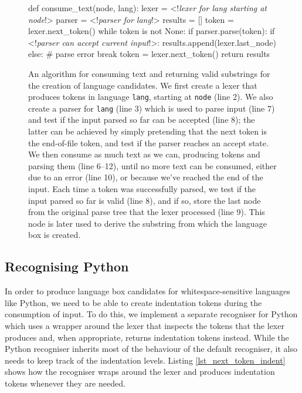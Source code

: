 \documentclass[sigplan,screen]{acmart}\settopmatter{printfolios=true,printccs=false,printacmref=false}
\begin{document}
\begin{figure}
\begin{lstdefault}[]
def consume_text(node, lang):
  lexer = <!\textit{lexer for lang starting at node}!>
  parser = <!\textit{parser for lang}!>
  results = []
  token = lexer.next_token()
  while token is not None:
    if parser.parse(token):
      if <!\textit{parser can accept current input}!>:
        results.append(lexer.last_node)
    else: # parse error
      break
    token = lexer.next_token()
  return results
\end{lstdefault}
\caption{An algorithm for consuming text and returning valid
substrings for the creation of language candidates. We first create a lexer that
produces tokens in language \texttt{lang}, starting at \texttt{node} (line 2).
We also create a parser for \texttt{lang} (line 3) which is used to parse input (line 7) and test if the
input parsed so far can be accepted (line 8); the latter can be achieved by simply pretending
that the next token is the end-of-file token, and test if the
parser reaches an accept state. We then consume as much text as we can,
producing tokens and parsing them (line 6--12), until no more text can be
consumed, either due to an error (line 10), or because we've reached the end of
the input. Each time a token was successfully parsed, we test if the input parsed so far is
valid (line 8), and if so, store the last node from the original parse tree that the lexer
processed (line 9). This node is later used to derive the substring from which the
language box is created.}
\label{lst_consume_text}
\end{figure}

\subsection{Recognising Python}
\label{sec:impl_wsrec}

In order to produce language box candidates for whitespace-sensitive languages
like Python, we need to be able to create indentation tokens during the
consumption of input. To do
this, we implement a separate recogniser for Python which uses a wrapper around the lexer that inspects
the tokens that the lexer produces and, when appropriate, returns indentation
tokens instead. While the Python recogniser inherits most of the behaviour of
the default recogniser, it also needs to keep track of the indentation levels. Listing
\ref{lst_next_token_indent} shows how the recogniser wraps around the lexer and
produces indentation tokens whenever they are needed.
\end{document}
